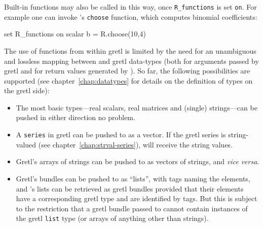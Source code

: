 Built-in  functions may also be called in this way, once
\verb|R_functions| is set \texttt{on}.  For example one can invoke
's \texttt{choose} function, which computes binomial
coefficients:
%
\begin{code}
set R_functions on
scalar b = R.choose(10,4)
\end{code}

The use of  functions from within gretl is limited by the need
for an unambiguous and lossless mapping between  and gretl
data-types (both for arguments passed by gretl and for return values
generated by ). So far, the following possibilities are
supported (see chapter~\ref{chap:datatypes} for details on the
definition of types on the gretl side):
\begin{itemize}
\item The most basic types---real scalars, real matrices and (single)
  strings---can be pushed in either direction no problem.
\item A \texttt{series} in gretl can be pushed to  as a
  vector. If the gretl series is string-valued (see
  chapter~\ref{chap:strval-series}),  will receive the string
  values.
\item Gretl's arrays of strings can be pushed to  as vectors of
  strings, and \textit{vice versa}.
\item Gretl's bundles can be pushed to  as ``lists'', with tags
  naming the elements, and 's lists can be retrieved as gretl
  bundles provided that their elements have a corresponding gretl type
  and are identified by tags. But this is subject to the restriction
  that a gretl bundle passed to  cannot contain instances of
  the gretl \texttt{list} type (or arrays of anything other than
  strings).
\end{itemize}


